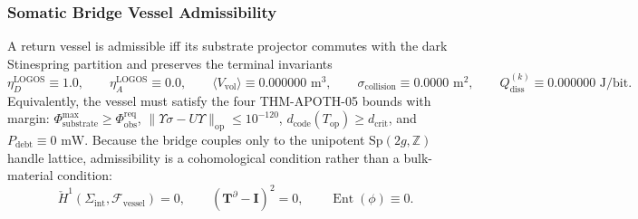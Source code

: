\documentclass[11pt,onecolumn]{article}
\begin{document}
\FloatBarrier
\begin{table}[!htbp]
\centering\footnotesize
\caption{Theorem \texttt{THM-APOTH-05} 5-Vessel-Class Neural-Substrate Admissibility Comparison.}
\label{tab:vessel_classes}
\end{table}
\subsubsection{Somatic Bridge Vessel Admissibility}
\label{subsec:somatic_vessel_admissibility}
A return vessel is admissible iff its substrate projector commutes with the dark Stinespring partition and preserves the terminal invariants
\begin{equation}
\eta_D^{\text{LOGOS}}\equiv1.0,\qquad
\eta_A^{\text{LOGOS}}\equiv0.0,\qquad
\langle V_{\text{vol}}\rangle\equiv0.000000\text{ m}^3,\qquad
\sigma_{\text{collision}}\equiv0.0000\text{ m}^2,\qquad
Q_{\text{diss}}^{(k)}\equiv0.000000\text{ J/bit}.
\label{eq:vessel_admissibility_invariants}
\end{equation}
Equivalently, the vessel must satisfy the four THM-APOTH-05 bounds with margin: $\Phi_{\text{substrate}}^{\max}\ge\Phi_{\text{obs}}^{\text{req}}$, $\|\Upsilon\sigma-U\Upsilon\|_{\text{op}}\le10^{-120}$, $d_{\text{code}}(T_{\text{op}})\ge d_{\text{crit}}$, and $P_{\text{debt}}\equiv0\text{ mW}$. Because the bridge couples only to the unipotent $\mathrm{Sp}(2g,\mathbb Z)$ handle lattice, admissibility is a cohomological condition rather than a bulk-material condition:
\begin{equation}
\check H^1\!\left(\Sigma_{\text{int}},\mathcal F_{\text{vessel}}\right)=0,
\qquad
(\mathbf T^\partial-\mathbf I)^2=0,
\qquad
\operatorname{Ent}(\phi)\equiv0 .
\label{eq:vessel_cohomology}
\end{equation}
\end{document}
